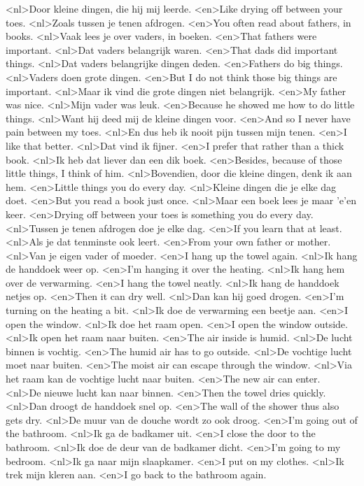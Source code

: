 <nl>Door kleine dingen, die hij mij leerde.
<en>Like drying off between your toes.
<nl>Zoals tussen je tenen afdrogen.
<en>You often read about fathers, in books.
<nl>Vaak lees je over vaders, in boeken.
<en>That fathers were important.
<nl>Dat vaders belangrijk waren.
<en>That dads did important things.
<nl>Dat vaders belangrijke dingen deden.
<en>Fathers do big things.
<nl>Vaders doen grote dingen.
<en>But I do not think those big things are important.
<nl>Maar ik vind die grote dingen niet belangrijk.
<en>My father was nice.
<nl>Mijn vader was leuk.
<en>Because he showed  me how to do little things.
<nl>Want hij deed mij de kleine dingen voor.
<en>And so I never have pain between my toes.
<nl>En dus heb ik nooit pijn tussen mijn tenen.
<en>I like that better.
<nl>Dat vind ik fijner.
<en>I prefer that rather than a thick book.
<nl>Ik heb dat liever dan een dik boek.
<en>Besides, because of those little things, I think of him.
<nl>Bovendien, door die kleine dingen, denk ik aan hem.
<en>Little things you do every day.
<nl>Kleine dingen die je elke dag doet.
<en>But you read a book just once.
<nl>Maar een boek lees je maar 'e'en keer.
<en>Drying off  between your toes is something you do every day.
<nl>Tussen je tenen afdrogen doe je elke dag.
<en>If you learn that at least.
<nl>Als je dat tenminste ook leert.
<en>From your own father or mother.
<nl>Van je eigen vader of moeder.
<en>I hang up the towel again.
<nl>Ik hang de handdoek weer op.
<en>I'm hanging it over the heating.
<nl>Ik hang hem over de verwarming.
<en>I hang the towel neatly.
<nl>Ik hang de handdoek netjes op.
<en>Then it can dry well.
<nl>Dan kan hij goed drogen.
<en>I'm turning on the heating a bit.
<nl>Ik doe de verwarming een beetje aan.
<en>I open the window.
<nl>Ik doe het raam open.
<en>I open the window outside.
<nl>Ik open het raam naar buiten.
<en>The air inside is humid.
<nl>De lucht binnen is vochtig.
<en>The humid air has to go outside.
<nl>De vochtige lucht moet naar buiten.
<en>The moist air can escape through the window.
<nl>Via het raam kan de vochtige lucht naar buiten.
<en>The new air can enter.
<nl>De nieuwe lucht kan naar binnen.
<en>Then the towel dries quickly.
<nl>Dan droogt de handdoek snel op.
<en>The wall of the shower  thus also gets dry.
<nl>De muur van de douche wordt zo ook droog.
<en>I'm going out of the bathroom.
<nl>Ik ga de badkamer uit.
<en>I close the door to the bathroom.
<nl>Ik doe de deur van de badkamer dicht.
<en>I'm going to my bedroom.
<nl>Ik ga naar mijn slaapkamer.
<en>I put on my clothes.
<nl>Ik trek mijn kleren aan.
<en>I go back to the bathroom again.
